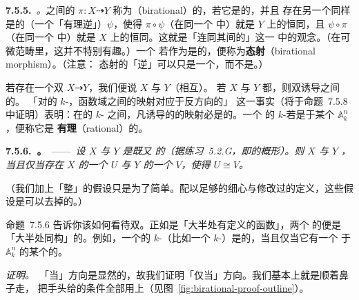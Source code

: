 \textbf{7.5.5.}\ \emph{\trhDefinition{}。}\quad \trIntegral{}\trScheme{}之间的\trRationalMap{}%
$\pi\colon X\dashrightarrow Y$ 称为\textbf{\trBirational{}}（birational）的，若它是\trDominant{}的，并且%
存在另一个同样是\trDominant{}的\trRationalMap{}（一个「有理逆」）$\psi$，使得 $\pi\circ\psi$（在同一个%
\trEquivalenceClass{}中）就是 $Y$ 上的恒同，且 $\psi\circ\pi$（在同一个\trEquivalenceClass{}%
中）就是 $X$ 上的恒同。这就是「\trIntegral{}\trScheme{}连同其间的\trDominant{}\trRationalMap{}」这一%
\trCategory{}中的\trIsomorphism{}观念。（在可微范畴里，这并不特别有趣。）一个\trMorphism{}%
若作为\trRationalMap{}是\trBirational{}的，便称为\textbf{\trBirational{}态射}（birational morphism）。（注意：%
\trBirational{}态射的「逆」可以只是一个\trRationalMap{}，而不是\trMorphism。）

若存在一个双\trRationalMap{} $X\dashrightarrow Y$，我们便说 $X$ 与 $Y$（相互）\trBirational{}。%
若 $X$ 与 $Y$ 都\trIrreducible，则双\trRationalMap{}诱导\trFunctionField{}之间的\trIsomorphism。%
「对\trIntegral\trFiniteType{}的 $k$-\trScheme，函数域之间的映射对应于反方向的\trRationalMap{}」%
这一事实（将于命题~7.5.8 中证明）表明：在\trIntegral\trFiniteType{}的 $k$-\trScheme{}%
之间，凡诱导\trFunctionField{}的\trIsomorphism{}的映射必是\trBirational{}的。一个%
\trIntegral\trFiniteType{}的 $k$-\trScheme{}若是\trBirational{}于某个 $\mathbb{A}^n_k$，便称它是%
\textbf{有理}（rational）的。

\textbf{7.5.6.\ \trhProposition。}\ ——\ \emph{设 $X$ 与 $Y$ 是既\trIrreducible{}又%
\trReduced{}的\trScheme（据练习~5.2.G，即\trIntegral{}的概形）。则 $X$ 与 $Y$ \trBirational{}，%
当且仅当存在 $X$ 的一个\trDense\trOpenSubscheme{} $U$ 与 $Y$ 的一个\trDense%
\trOpenSubscheme{} $V$，使得 $U\cong V$。}

（我们加上「整」的假设只是为了简单。配以足够的细心与修改过的定义，这些假设是可以去掉的。）

命题~7.5.6 告诉你该如何看待双\trRationalMap{}。正如\trRationalMap{}是「大半处有定义的函数」，两个\trBirational{}%
的\trReduced{}\trScheme{}便是「大半处同构」的。例如，一个\trReduced\trFiniteType{}的%
$k$-\trScheme（比如一个\trAffine{} $k$-\trVariety）是\trRational{}的，当且仅当它有一个%
\trIsomorphic{}于 $\mathbb{A}^n_k$ 的某个\trOpenSubscheme{}的\trDense\trOpenSubscheme。

\emph{证明。}\ 「当」方向是显然的，故我们证明「仅当」方向。我们基本上就是顺着鼻子走，%
把手头给的条件全部用上（见图~\ref{fig:birational-proof-outline}）。

